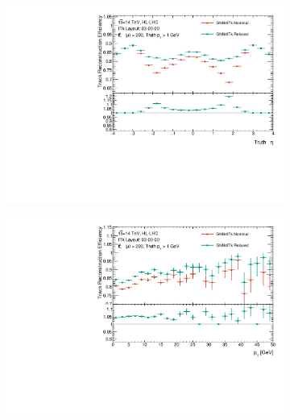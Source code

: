 \begin{figure}[h!]
\centering
\begin{subfigure}{0.49\textwidth}
    \centering
    \includegraphics[width=\textwidth]{figures/nominal-vs-relaxed-cuts/Efficiency/efficiency_vs_eta.pdf}
    \caption{}
    \label{subfig:nominal-vs-relaxed-eff}
\end{subfigure}
\begin{subfigure}{0.49\textwidth}
    \centering
    \includegraphics[width=\textwidth]{figures/nominal-vs-relaxed-cuts/Efficiency/efficiency_vs_pt.pdf}
    \caption{}
    \label{subfig:nominal-vs-relaxed-eff-pt}
\end{subfigure}
\begin{subfigure}{0.49\textwidth}
    \centering

\end{subfigure}
\end{figure}
